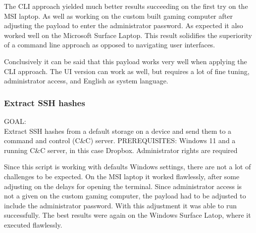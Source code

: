 The CLI approach yielded much better results succeeding on the first try on the MSI laptop. As well as working on the custom built gaming computer after adjusting the payload to enter the administrator password. As expected it also worked well on the Microsoft Surface Laptop. This result solidifies the superiority of a command line approach as opposed to navigating user interfaces. 


Conclusively it can be said that this payload works very well when applying the CLI approach. The UI version can work as well, but requires a lot of fine tuning, administrator access, and English as system language. 



\subsubsection{Extract SSH hashes}

GOAL:\\ Extract SSH hashes from a default storage on a device and send them to a command and control (C\&C) server.
PREREQUISITES: Windows 11 and a running C\&C server, in this case Dropbox. Administrator rights are required

Since this script is working with defaults Windows settings, there are not a lot of challenges to be expected. On the MSI laptop it worked flawlessly, after some adjusting on the delays for opening the terminal. Since administrator access is not a given on the custom gaming computer, the payload had to be adjusted to include the administrator password. With this adjustment it was able to run successfully. The best results were again on the Windows Surface Latop, where it executed flawlessly. 


